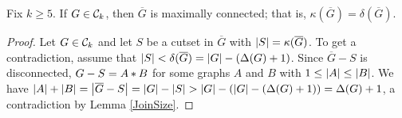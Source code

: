 \begin{lem}
Fix $k \geq 5$. If $G \in \mathcal{C}_{k}$, then $\overline{G}$ is maximally connected; that is, $\kappa(\overline{G}) = \delta(\overline{G})$.
\end{lem}
\begin{proof}

Let $G \in \mathcal{C}_{k}$ and let $S$ be a cutset in $\overline{G}$ with $\left|S\right| = \kappa(\overline{G})$.  To get a contradiction, assume that 
$\left|S\right| < \delta(\overline{G}) = \left|G\right| - (\Delta(G) + 1)$.  
Since $\overline{G}-S$ is disconnected, $G - S = A \mbox{\hspace{2 pt}$\ast$\hspace{2 pt}} B$ for some graphs
$A$ and $B$ with $1 \leq \left|A\right| \leq \left|B\right|$.  We have $\card{A} + \card{B}
= \card{\overline{G}-S}=\card{G}-\card{S}> \card{G} - (\card{G} - (\Delta(G) + 1)) = \Delta(G) + 1$, a contradiction by Lemma \ref{JoinSize}.
\end{proof}
